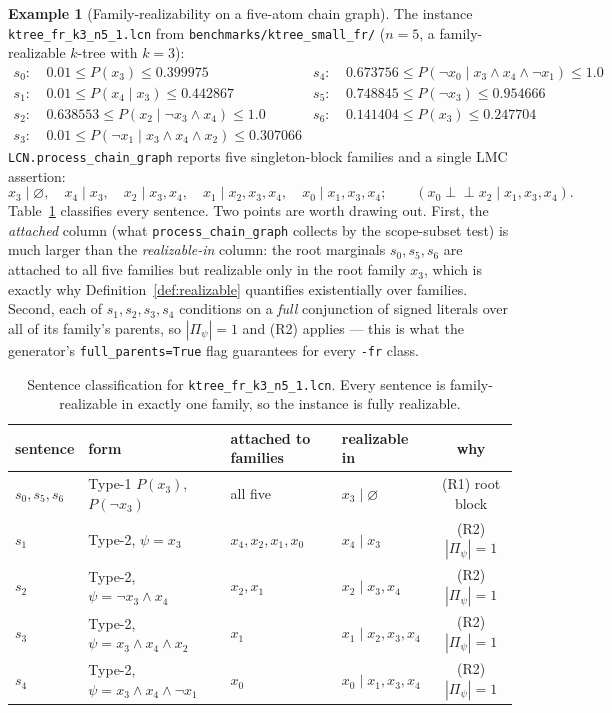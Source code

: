 \documentclass[11pt]{article}
\theoremstyle{definition}
\newtheorem{example}{Example}
\newcommand{\indep}{\perp\!\!\!\perp}
\begin{document}
\begin{example}[Family-realizability on a five-atom chain graph]\label{ex:fr5}
The instance \texttt{ktree\_fr\_k3\_n5\_1.lcn} from \texttt{benchmarks/ktree\_small\_fr/}
($n{=}5$, a family-realizable $k$-tree with $k{=}3$):
\begin{align*}
  s_0:&\ 0.01\le P(x_3)\le0.399975 &
  s_4:&\ 0.673756\le P(\lnot x_0\mid x_3\wedge x_4\wedge\lnot x_1)\le1.0\\
  s_1:&\ 0.01\le P(x_4\mid x_3)\le0.442867 &
  s_5:&\ 0.748845\le P(\lnot x_3)\le0.954666\\
  s_2:&\ 0.638553\le P(x_2\mid\lnot x_3\wedge x_4)\le1.0 &
  s_6:&\ 0.141404\le P(x_3)\le0.247704\\
  s_3:&\ 0.01\le P(\lnot x_1\mid x_3\wedge x_4\wedge x_2)\le0.307066
\end{align*}
\texttt{LCN.process\_chain\_graph} reports five singleton-block families and a single LMC assertion:
\[
  x_3\mid\varnothing,\quad x_4\mid x_3,\quad x_2\mid x_3,x_4,\quad
  x_1\mid x_2,x_3,x_4,\quad x_0\mid x_1,x_3,x_4;
  \qquad (x_0\indep x_2\mid x_1,x_3,x_4).
\]
Table~\ref{tab:fr5} classifies every sentence. Two points are worth drawing out. First, the
\emph{attached} column (what \texttt{process\_chain\_graph} collects by the scope-subset test) is
much larger than the \emph{realizable-in} column: the root marginals $s_0,s_5,s_6$ are attached to
all five families but realizable only in the root family $x_3$, which is exactly why
Definition~\ref{def:realizable} quantifies existentially over families. Second, each of
$s_1,s_2,s_3,s_4$ conditions on a \emph{full} conjunction of signed literals over all of its
family's parents, so $|\Pi_\psi|=1$ and (R2) applies --- this is what the generator's
\texttt{full\_parents=True} flag guarantees for every \texttt{-fr} class.

\begin{table}[ht]\centering\small
\caption{Sentence classification for \texttt{ktree\_fr\_k3\_n5\_1.lcn}. Every sentence is
family-realizable in exactly one family, so the instance is fully realizable.}\label{tab:fr5}
\begin{tabular}{@{}llllc@{}}
\toprule
sentence & form & attached to families & realizable in & why \\
\midrule
$s_0,s_5,s_6$ & Type-1 $P(x_3)$, $P(\lnot x_3)$ & all five & $x_3\mid\varnothing$ & (R1) root block \\
$s_1$ & Type-2, $\psi=x_3$            & $x_4,x_2,x_1,x_0$ & $x_4\mid x_3$        & (R2) $|\Pi_\psi|{=}1$ \\
$s_2$ & Type-2, $\psi=\lnot x_3\wedge x_4$ & $x_2,x_1$    & $x_2\mid x_3,x_4$    & (R2) $|\Pi_\psi|{=}1$ \\
$s_3$ & Type-2, $\psi=x_3\wedge x_4\wedge x_2$ & $x_1$     & $x_1\mid x_2,x_3,x_4$& (R2) $|\Pi_\psi|{=}1$ \\
$s_4$ & Type-2, $\psi=x_3\wedge x_4\wedge\lnot x_1$ & $x_0$ & $x_0\mid x_1,x_3,x_4$& (R2) $|\Pi_\psi|{=}1$ \\
\bottomrule
\end{tabular}
\end{table}


\end{example}
\end{document}
